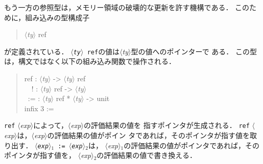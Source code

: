 \documentclass{jbook}
\newcommand{\code}[1]{\mbox{\large\tt #1}}
\newcommand{\nonterm}[1]{\mbox{$\langle$}{\it #1}\mbox{$\rangle$}}
\newenvironment{program}{\begin{quote}\begin{tt}}%
                        {\end{tt}\end{quote}}
\begin{document}
	もう一方の参照型は，メモリー領域の破壊的な更新を許す機構である．
	このために，組み込みの型構成子
\begin{program}
\nonterm{ty} ref
\end{program}
が定義されている．
	\code{\nonterm{ty} ref}の値は\nonterm{ty}型の値へのポインターで
ある．
	この型は，構文ではなく以下の組み込み関数で操作される．
\begin{program}
ref : \nonterm{ty} -> \nonterm{ty} ref\\
\ \ ! : \nonterm{ty} ref -> \nonterm{ty}\\
\ :=  : \nonterm{ty} ref * \nonterm{ty}  -> unit\\
infix 3 :=
\end{program}
	\code{ref} \nonterm{exp}によって，\nonterm{exp}の評価結果の値を
指すポインタが生成される．
	\code{ref} \nonterm{exp}は，\nonterm{exp}の評価結果の値がポイン
タであれば，そのポインタが指す値を取り出す．
	\code{\nonterm{exp}$_1$ := \nonterm{exp}$_2$}は，
\nonterm{exp}$_1$の評価結果の値がポインタであれば，そのポインタが指す値を，
\nonterm{exp}$_2$の評価結果の値で書き換える．
\end{document}
